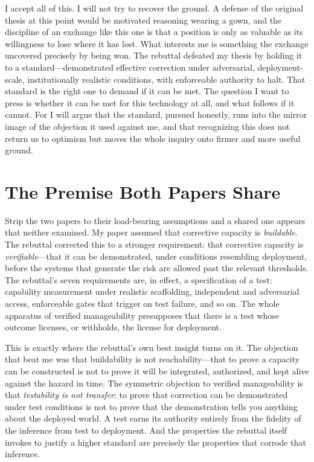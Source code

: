 \documentclass[11pt]{article}
\begin{document}
I accept all of this. I will not try to recover the ground. A defense of the original thesis at this point would be motivated reasoning wearing a gown, and the discipline of an exchange like this one is that a position is only as valuable as its willingness to lose where it has lost. What interests me is something the exchange uncovered precisely by being won. The rebuttal defeated my thesis by holding it to a standard---demonstrated effective correction under adversarial, deployment-scale, institutionally realistic conditions, with enforceable authority to halt. That standard is the right one to demand if it can be met. The question I want to press is whether it can be met for this technology at all, and what follows if it cannot. For I will argue that the standard, pursued honestly, runs into the mirror image of the objection it used against me, and that recognizing this does not return us to optimism but moves the whole inquiry onto firmer and more useful ground.

\section{The Premise Both Papers Share}
\label{sec:premise}

Strip the two papers to their load-bearing assumptions and a shared one appears that neither examined. My paper assumed that corrective capacity is \emph{buildable}. The rebuttal corrected this to a stronger requirement: that corrective capacity is \emph{verifiable}---that it can be demonstrated, under conditions resembling deployment, before the systems that generate the risk are allowed past the relevant thresholds. The rebuttal's seven requirements are, in effect, a specification of a test: capability measurement under realistic scaffolding, independent and adversarial access, enforceable gates that trigger on test failure, and so on. The whole apparatus of verified manageability presupposes that there is a test whose outcome licenses, or withholds, the license for deployment.

This is exactly where the rebuttal's own best insight turns on it. The objection that beat me was that buildability is not reachability---that to prove a capacity can be constructed is not to prove it will be integrated, authorized, and kept alive against the hazard in time. The symmetric objection to verified manageability is that \emph{testability is not transfer}: to prove that correction can be demonstrated under test conditions is not to prove that the demonstration tells you anything about the deployed world. A test earns its authority entirely from the fidelity of the inference from test to deployment. And the properties the rebuttal itself invokes to justify a higher standard are precisely the properties that corrode that inference.
\end{document}

